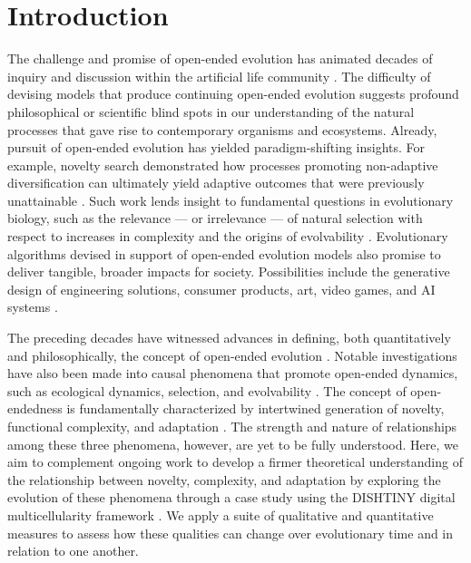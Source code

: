 

\section{Introduction}

The challenge and promise of open-ended evolution has animated decades of inquiry and discussion within the artificial life community \citep{packard2019overview}.
The difficulty of devising models that produce continuing open-ended evolution suggests profound philosophical or scientific blind spots in our understanding of the natural processes that gave rise to contemporary organisms and ecosystems.
Already, pursuit of open-ended evolution has yielded paradigm-shifting insights.
For example, novelty search demonstrated how processes promoting non-adaptive diversification can ultimately yield adaptive outcomes that were previously unattainable \citep{lehman2011abandoning}.
Such work lends insight to fundamental questions in evolutionary biology, such as the relevance --- or irrelevance --- of natural selection with respect to increases in complexity \citep{lehman2012evolution, Lynch8597} and the origins of evolvability \citep{lehman2013evolvability,Kirschner8420}.
Evolutionary algorithms devised in support of open-ended evolution models also promise to deliver tangible, broader impacts for society.
Possibilities include the generative design of engineering solutions, consumer products, art, video games, and AI systems \citep{nguyen2015,stanley2019open}.

The preceding decades have witnessed advances in defining, both quantitatively and philosophically, the concept of open-ended evolution \citep{lehman2012beyond,dolson2019modes,bedau1998classification}.
Notable investigations have also been made into causal phenomena that promote open-ended dynamics, such as ecological dynamics, selection, and evolvability \citep{dolson2019constructive,soros2014identifying,huizinga2018emergence}.
The concept of open-endedness is fundamentally characterized by intertwined generation of novelty, functional complexity, and adaptation \citep{taylor2016open}.
The strength and nature of relationships among these three phenomena, however, are yet to be fully understood.
Here, we aim to complement ongoing work to develop a firmer theoretical understanding of the relationship between novelty, complexity, and adaptation by exploring the evolution of these phenomena through a case study using the DISHTINY digital multicellularity framework .
We apply a suite of qualitative and quantitative measures to assess how these qualities can change over evolutionary time and in relation to one another.
